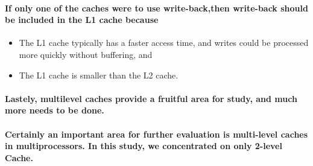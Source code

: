 \documentclass{article}
\begin{document}
\paragraph{If only one of the caches were to use write-back,then write-back
should be included in the L1 cache because}

\begin{itemize}
    \item The L1 cache typically has a faster access time, and writes
    could be processed more quickly without buffering, and

    \item The L1 cache is smaller than the L2 cache.

\end{itemize}

\paragraph{Lastely, multilevel caches provide a fruitful 
area for study, and much more needs to be done.}

\paragraph{Certainly an important area for further evaluation 
is multi-level caches in multiprocessors. In this study, we concentrated
on only 2-level Cache.}
\printindex
\end{document}
